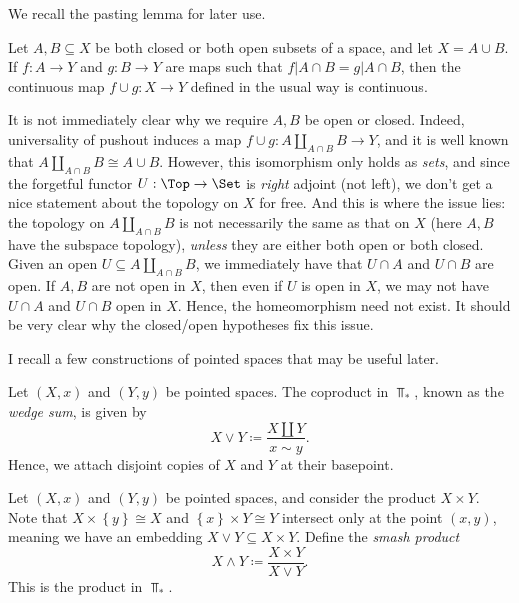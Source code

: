 We recall the pasting lemma for later use.

\begin{lemma}[Pasting]\label{lma:1.1.2}
	Let $A,B \subseteq X$ be both closed or both open subsets of a space, and let $X = A \cup B$. If $f : A \to Y$ and $g : B \to Y$ are maps such that $f|A \cap B=g|A \cap B$, then the continuous map $f\cup g : X \to Y$ defined in the usual way is continuous.
\end{lemma}

\begin{remark}\label{rmk:1.1.3}
	It is not immediately clear why we require $A,B$ be open or closed. Indeed, universality of pushout induces a map $f\cup g : A\amalg_{A \cap B} B \to Y$, and it is well known that $A \amalg _{A \cap B} B \cong A \cup B$. However, this isomorphism only holds as \emph{sets}, and since the forgetful functor $U : \Top  \to \Set $ is \emph{right} adjoint (not left), we don't get a nice statement about the topology on $X$ for free. And this is where the issue lies: the topology on $A \amalg_{A \cap B} B$ is not necessarily the same as that on $X$ (here $A,B$ have the subspace topology), \emph{unless} they are either both open or both closed. Given an open $U \subseteq A \amalg _{A \cap B} B$, we immediately have that $U \cap A$ and $U \cap B$ are open. If $A,B$ are not open in $X$, then even if $U$ is open in $X$, we may not have $U \cap A$ and $U \cap B$ open in $X$. Hence, the homeomorphism need not exist. It should be very clear why the closed/open hypotheses fix this issue.
\end{remark}

I recall a few constructions of pointed spaces that may be useful later.

\begin{definition}\label{dfn:1.1.4}
	Let $(X,x)$ and $(Y,y)$ be pointed spaces. The coproduct in $\Top _*$, known as the \emph{wedge sum}, is given by
	\[
		X \vee Y \coloneqq \frac{X\amalg Y}{x\sim y} 
	.\]
	Hence, we attach disjoint copies of $X$ and $Y$ at their basepoint.
\end{definition}
\begin{definition}\label{dfn:1.1.5}
	Let $(X,x)$ and $(Y,y)$ be pointed spaces, and consider the product $X\times Y$. Note that $X\times \left\{ y \right\} \cong X$ and $\left\{ x \right\} \times Y \cong Y$ intersect only at the point $(x,y)$, meaning we have an embedding $X\vee Y \subseteq X\times Y$. Define the \emph{smash product}
	\[
		X\wedge Y \coloneqq \frac{X\times Y}{X \vee Y} 
	.\]
	This is the product in $\Top _*$.
\end{definition}
